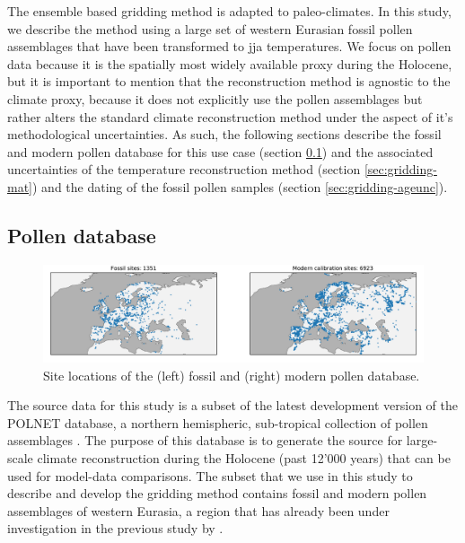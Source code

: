 \begin{refsection}
The ensemble based gridding method is adapted to paleo-climates. In this study, we describe the method using a large set of western Eurasian fossil pollen assemblages that have been transformed to \gls{jja} temperatures. We focus on pollen data because it is the spatially most widely available proxy during the Holocene, but it is important to mention that the reconstruction method is agnostic to the climate proxy, because it does not explicitly use the pollen assemblages but rather alters the standard climate reconstruction method under the aspect of it's methodological uncertainties. As such, the following sections describe the fossil and modern pollen database for this use case (section \ref{sec:gridding-polnet}) and the associated uncertainties of the temperature reconstruction method (section \ref{sec:gridding-mat}) and the dating of the fossil pollen samples (section \ref{sec:gridding-ageunc}).

\subsection{Pollen database}  \label{sec:gridding-polnet}

\begin{figure}
	\includegraphics[width=\linewidth]{gridding-figures/sitelocs.pdf}
	\caption[Pollen Database]{Site locations of the (left) fossil and (right) modern pollen database.}
	\label{fig:gridding-fossil}
\end{figure}

The source data for this study is a subset of the latest development version of the POLNET database, a northern hemispheric, sub-tropical collection of pollen assemblages \citep{DavisKaplan2017, SommerDavisChevalierEtAl2019}. The purpose of this database is to generate the source for large-scale climate reconstruction during the Holocene (past 12'000 years) that can be used for model-data comparisons. The subset that we use in this study to describe and develop the gridding method contains fossil and modern pollen assemblages of western Eurasia, a region that has already been under investigation in the previous study by \cite{MauriDavisCollinsEtAl2015}. 


\end{refsection}
